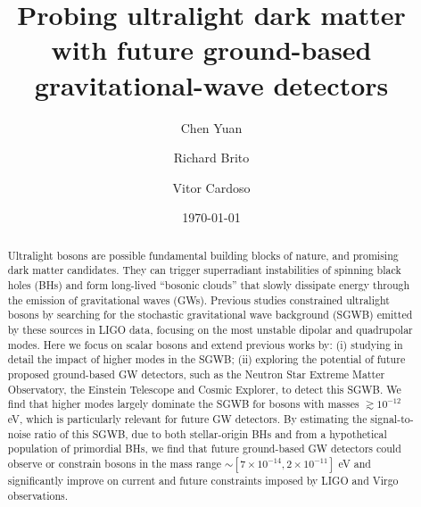 \documentclass[
reprint,           %
superscriptaddress,%
amsmath,           %
amssymb,           %
aps,               %
prd,               %
notitlepage,       %
floatfix,          %
nofootinbib %
]{revtex4-1}
\begin{document}
	
\title{Probing ultralight dark matter with future ground-based gravitational-wave detectors}
\author{Chen Yuan}

\author{Richard Brito}

\author{Vitor Cardoso}

	
\date{\today}
	
\begin{abstract}
Ultralight bosons are possible fundamental building blocks of nature, and promising dark matter candidates. They can trigger superradiant instabilities of spinning black holes (BHs) and form long-lived ``bosonic clouds''  that slowly dissipate energy through the emission of gravitational waves (GWs). Previous studies constrained ultralight bosons by searching for the stochastic gravitational wave background (SGWB) emitted by these sources in LIGO data, focusing on the most unstable dipolar and quadrupolar modes. Here we focus on scalar bosons and extend previous works by: (i) studying in detail the impact of higher modes in the SGWB; (ii) exploring the potential of future proposed ground-based GW detectors, such as the Neutron Star Extreme Matter Observatory, the Einstein Telescope and Cosmic Explorer, to detect this SGWB. We find that higher modes largely dominate the SGWB for bosons with masses $\gtrsim 10^{-12}$ eV, which is particularly relevant for future GW detectors. By estimating the signal-to-noise ratio of this SGWB, due to both stellar-origin BHs and from a hypothetical population of primordial BHs, we find that future ground-based GW detectors could observe or constrain bosons in the mass range $\sim [7\times 10^{-14}, 2\times 10^{-11}]$ eV and significantly improve on current and future constraints imposed by LIGO and Virgo observations. 
\end{abstract}
	
\end{document}
